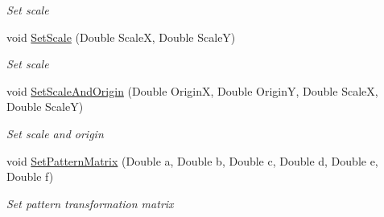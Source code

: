 \begin{DoxyCompactItemize}
\begin{DoxyCompactList}\small\item\em Set scale \end{DoxyCompactList}\item 
void \hyperlink{class_pdf_file_writer_1_1_pdf_tiling_pattern_a2bae9e36108820f9aea5084c08404556}{Set\+Scale} (Double ScaleX, Double ScaleY)
\begin{DoxyCompactList}\small\item\em Set scale \end{DoxyCompactList}\item 
void \hyperlink{class_pdf_file_writer_1_1_pdf_tiling_pattern_af6bd2cf1a9d548f74e5708a15025be15}{Set\+Scale\+And\+Origin} (Double OriginX, Double OriginY, Double ScaleX, Double ScaleY)
\begin{DoxyCompactList}\small\item\em Set scale and origin \end{DoxyCompactList}\item 
void \hyperlink{class_pdf_file_writer_1_1_pdf_tiling_pattern_a157186ba057b69e972023729f7744e8e}{Set\+Pattern\+Matrix} (Double a, Double b, Double c, Double d, Double e, Double f)
\begin{DoxyCompactList}\small\item\em Set pattern transformation matrix \end{DoxyCompactList}\end{DoxyCompactItemize}

